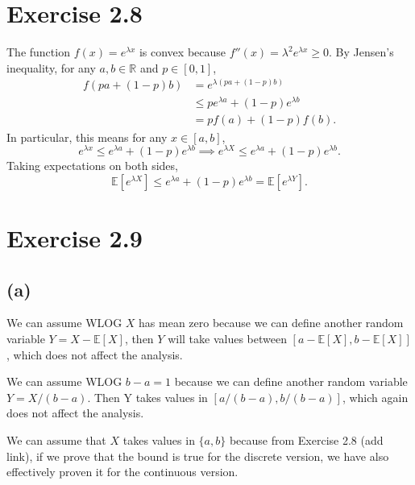 \newpage
\section*{Exercise 2.8}
The function $f(x) = e^{\lambda x}$ is convex because $f''(x) = \lambda^2 e^{\lambda x} \geq 0$. By 
Jensen's inequality, for any $a, b \in \mathbb{R}$ and $p \in [0, 1]$, 
\begin{align*}
	f(pa + (1 - p)b) 
	&= e^{\lambda(pa + (1 - p)b)} \\
	&\leq p e^{\lambda a} + (1 - p) e^{\lambda b} \\
	&= pf(a) + (1 - p)f(b).
\end{align*}
In particular, this means for any $x \in [a, b]$, 
\[ e^{\lambda x} \leq e^{\lambda a} + (1 - p) e^{\lambda b} 
\implies e^{\lambda X} \leq e^{\lambda a} + (1 - p) e^{\lambda b}. \]
Taking expectations on both sides, 
\[ \mathbb{E}[e^{\lambda X}] \leq e^{\lambda a} + (1 - p) e^{\lambda b} = \mathbb{E}[e^{\lambda Y}]. \]


\newpage
\section*{Exercise 2.9}
\subsection*{(a)}
We can assume WLOG $X$ has mean zero because we can define another random variable $Y = X - \mathbb{E}[X]$, 
then $Y$ will take values between $[a - \mathbb{E}[X], b - \mathbb{E}[X]]$, which does not affect the 
analysis. 

We can assume WLOG $b - a = 1$ because we can define another random variable $Y = X / (b - a)$. Then 
Y takes values in $[a / (b - a), b / (b - a)]$, which again does not affect the analysis.

We can assume that $X$ takes values in $\{a, b\}$ because from Exercise 2.8 (add link), if we prove that 
the bound is true for the discrete version, we have also effectively proven it for the continuous version.

